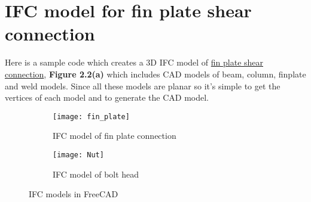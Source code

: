 \section{IFC model for fin plate shear connection}
Here is a sample code which creates a 3D IFC model of \href{https://github.com/chavan-vjti/IfcOpenShell/blob/master/Connection.py}{fin plate shear connection}, \textbf{Figure 2.2(a)} which includes CAD models of beam, column, finplate and weld models. Since all these models are planar so it's simple to get the vertices of each model and to generate the CAD model.
\begin{figure}
	\centering
	\begin{subfigure}{.5\textwidth}
		\centering
		\texttt{[image: fin\_plate]}
		\caption{IFC model of fin plate connection}
	\end{subfigure}%
	\begin{subfigure}{.5\textwidth}
		\centering
		\texttt{[image: Nut]}
		\caption{IFC model of bolt head}

	\end{subfigure}
	\caption{IFC models in FreeCAD}

\end{figure}




